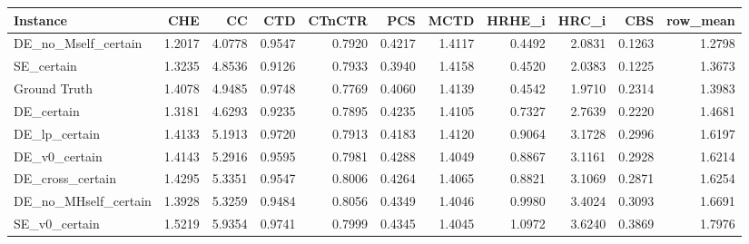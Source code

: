 \begin{tabular}{lrrrrrrrrrr}
\toprule
Instance & CHE & CC & CTD & CTnCTR & PCS & MCTD & HRHE_i & HRC_i & CBS & row_mean \\
\midrule
DE_no_Mself_certain & 1.2017 & 4.0778 & 0.9547 & 0.7920 & 0.4217 & 1.4117 & 0.4492 & 2.0831 & 0.1263 & 1.2798 \\
SE_certain & 1.3235 & 4.8536 & 0.9126 & 0.7933 & 0.3940 & 1.4158 & 0.4520 & 2.0383 & 0.1225 & 1.3673 \\
Ground Truth & 1.4078 & 4.9485 & 0.9748 & 0.7769 & 0.4060 & 1.4139 & 0.4542 & 1.9710 & 0.2314 & 1.3983 \\
DE_certain & 1.3181 & 4.6293 & 0.9235 & 0.7895 & 0.4235 & 1.4105 & 0.7327 & 2.7639 & 0.2220 & 1.4681 \\
DE_lp_certain & 1.4133 & 5.1913 & 0.9720 & 0.7913 & 0.4183 & 1.4120 & 0.9064 & 3.1728 & 0.2996 & 1.6197 \\
DE_v0_certain & 1.4143 & 5.2916 & 0.9595 & 0.7981 & 0.4288 & 1.4049 & 0.8867 & 3.1161 & 0.2928 & 1.6214 \\
DE_cross_certain & 1.4295 & 5.3351 & 0.9547 & 0.8006 & 0.4264 & 1.4065 & 0.8821 & 3.1069 & 0.2871 & 1.6254 \\
DE_no_MHself_certain & 1.3928 & 5.3259 & 0.9484 & 0.8056 & 0.4349 & 1.4046 & 0.9980 & 3.4024 & 0.3093 & 1.6691 \\
SE_v0_certain & 1.5219 & 5.9354 & 0.9741 & 0.7999 & 0.4345 & 1.4045 & 1.0972 & 3.6240 & 0.3869 & 1.7976 \\
\bottomrule
\end{tabular}
